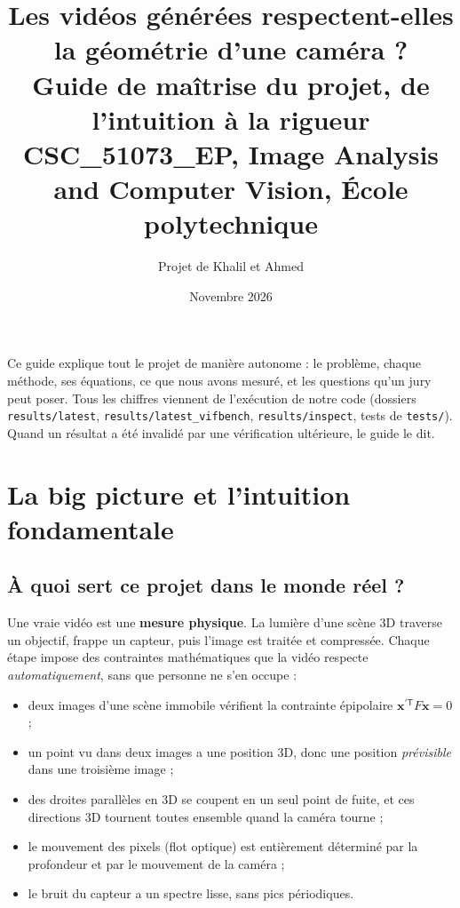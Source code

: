 \documentclass[11pt,a4paper]{article}
\title{\textbf{Les vidéos générées respectent-elles la géométrie d'une caméra ?}\\[4pt]
\large Guide de maîtrise du projet, de l'intuition à la rigueur\\
CSC\_51073\_EP, Image Analysis and Computer Vision, École polytechnique}
\author{Projet de Khalil et Ahmed}
\date{Novembre 2026}
\newcommand{\x}{\mathbf{x}}
\begin{document}
\maketitle

\noindent Ce guide explique tout le projet de manière autonome : le problème, chaque méthode, ses
équations, ce que nous avons mesuré, et les questions qu'un jury peut poser. Tous les chiffres
viennent de l'exécution de notre code (dossiers \texttt{results/latest},
\texttt{results/latest\_vifbench}, \texttt{results/inspect}, tests de \texttt{tests/}). Quand un
résultat a été invalidé par une vérification ultérieure, le guide le dit.

\tableofcontents
\newpage

\section{La big picture et l'intuition fondamentale}

\subsection{À quoi sert ce projet dans le monde réel ?}

Une vraie vidéo est une \textbf{mesure physique}. La lumière d'une scène 3D traverse un objectif,
frappe un capteur, puis l'image est traitée et compressée. Chaque étape impose des contraintes
mathématiques que la vidéo respecte \emph{automatiquement}, sans que personne ne s'en occupe :
\begin{itemize}
  \item deux images d'une scène immobile vérifient la contrainte épipolaire $\x^{\prime\mathsf{T}} F\x=0$ ;
  \item un point vu dans deux images a une position 3D, donc une position \emph{prévisible} dans une
        troisième image ;
  \item des droites parallèles en 3D se coupent en un seul point de fuite, et ces directions 3D
        tournent toutes ensemble quand la caméra tourne ;
  \item le mouvement des pixels (flot optique) est entièrement déterminé par la profondeur et par
        le mouvement de la caméra ;
  \item le bruit du capteur a un spectre lisse, sans pics périodiques.
\end{itemize}
\end{document}
